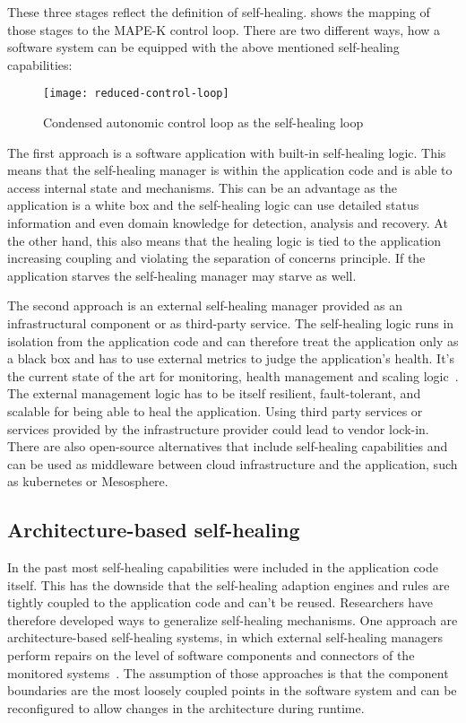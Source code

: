   These three stages reflect the definition of self-healing.
   shows the mapping of those stages to the MAPE-K control loop.
  There are two different ways, how a software system can be equipped with the above mentioned self-healing capabilities:

  \begin{figure}
    \centering
    \texttt{[image: reduced-control-loop]}
    \caption{Condensed autonomic control loop as the self-healing loop}
    \label{fig:self-healing-loop}
  \end{figure}

  The first approach is a software application with built-in self-healing logic.
  This means that the self-healing manager is within the application code and is able to access internal state and mechanisms.
  This can be an advantage as the application is a white box and the self-healing logic can use detailed status information and even domain knowledge for detection, analysis and recovery.
  At the other hand, this also means that the healing logic is tied to the application increasing coupling and violating the separation of concerns principle.
  If the application starves the self-healing manager may starve as well.

  The second approach is an external self-healing manager provided as an infrastructural component or as third-party service.
  The self-healing logic runs in isolation from the application code and can therefore treat the application only as a black box and has to use external metrics to judge the application's health.
  It's the current state of the art for monitoring, health management and scaling logic~\cite{ToffettiMicroservices}.
  The external management logic has to be itself resilient, fault-tolerant, and scalable for being able to heal the application.
  Using third party services or services provided by the infrastructure provider could lead to vendor lock-in.
  There are also open-source alternatives that include self-healing capabilities and can be used as middleware between cloud infrastructure and the application, such as \gls{kubernetes} or Mesosphere.

\subsection{Architecture-based self-healing}
  In the past most self-healing capabilities were included in the application code itself.
  This has the downside that the self-healing adaption engines and rules are tightly coupled to the application code and can't be reused.
  Researchers have therefore developed ways to generalize self-healing mechanisms.
  One approach are architecture-based self-healing systems, in which external self-healing managers perform repairs on the level of software components and connectors of the monitored systems~\cite{DashofyArchitecture}.
  The assumption of those approaches is that the component boundaries are the most loosely coupled points in the software system and can be reconfigured to allow changes in the architecture during runtime.


